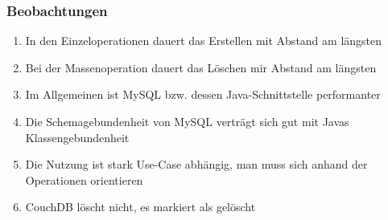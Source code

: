 \subsubsection{Beobachtungen}
\begin{enumerate}
    \item In den Einzeloperationen dauert das Erstellen mit Abstand am längsten
    \item Bei der Massenoperation dauert das Löschen mir Abstand am längsten
    \item Im Allgemeinen ist MySQL bzw. dessen Java-Schnittstelle performanter
    \item Die Schemagebundenheit von MySQL verträgt sich gut mit Javas Klassengebundenheit
    \item Die Nutzung ist stark Use-Case abhängig, man muss sich anhand der Operationen orientieren
    \item CouchDB löscht nicht, es markiert als gelöscht
\end{enumerate}
